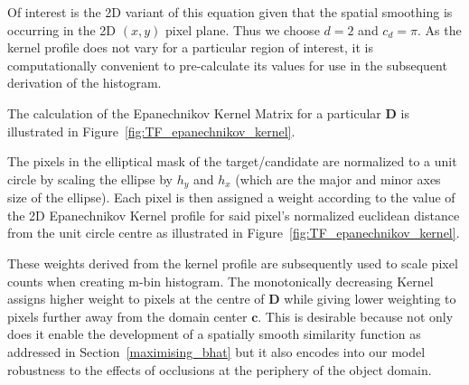 Of interest is the 2D variant of this equation given that the spatial smoothing
is occurring in the 2D $(x,y)$ pixel plane. Thus we choose $d=2$ and $c_d=\pi$.
As the kernel profile does not vary for a particular region of interest, it is
computationally convenient to pre-calculate its values for use in the subsequent
derivation of the histogram.

The calculation of the Epanechnikov Kernel Matrix for a particular $\mathbf{D}$ is
illustrated in Figure~\ref{fig:TF_epanechnikov_kernel}.


The pixels in the elliptical mask of the target/candidate are normalized to a unit
circle by scaling the ellipse by $h_y$ and $h_x$ (which are the major and minor
axes size of the ellipse). Each pixel is then assigned a weight according to the
value of the 2D Epanechnikov Kernel profile for said pixel's normalized euclidean
distance from the unit circle centre as illustrated in Figure~\ref{fig:TF_epanechnikov_kernel}.

These weights derived from the kernel profile are subsequently used to scale
pixel counts when creating m-bin histogram. The monotonically decreasing Kernel
assigns higher weight to pixels at the centre of $\mathbf{D}$ while giving lower
weighting to pixels further away from the domain center $\mathbf{c}$. 
This is desirable because not only does it enable the development of a spatially
smooth similarity function as addressed in Section~\ref{maximising_bhat} but it
also encodes into our model robustness to the effects of occlusions at the
periphery of the object domain.

